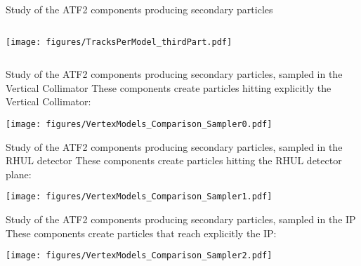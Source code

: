 \documentclass[xcolor={dvipsnames}]{beamer}
\begin{document}
\begin{frame}{Study of the ATF2 components producing secondary particles}
\begin{center}
{\begin{columns}
\begin{column}{0.8\textwidth}
\texttt{[image: figures/TracksPerModel\_thirdPart.pdf]}
  \end{column}
 \end{columns}
}
\end{center}
\end{frame}

\begin{frame}{Study of the ATF2 components producing secondary particles, sampled in the Vertical Collimator}
These components create particles hitting explicitly the Vertical Collimator:
 \begin{center}
\texttt{[image: figures/VertexModels\_Comparison\_Sampler0.pdf]}
\end{center}
\end{frame}
\begin{frame}{Study of the ATF2 components producing secondary particles, sampled in the RHUL detector}
These components create particles hitting the RHUL detector plane:
 \begin{center}
\texttt{[image: figures/VertexModels\_Comparison\_Sampler1.pdf]}
\end{center}
\end{frame}
\begin{frame}{Study of the ATF2 components producing secondary particles, sampled in the IP}
These components create particles that reach explicitly the IP:
 \begin{center}
\texttt{[image: figures/VertexModels\_Comparison\_Sampler2.pdf]}
\end{center}
\end{frame}
\end{document}
